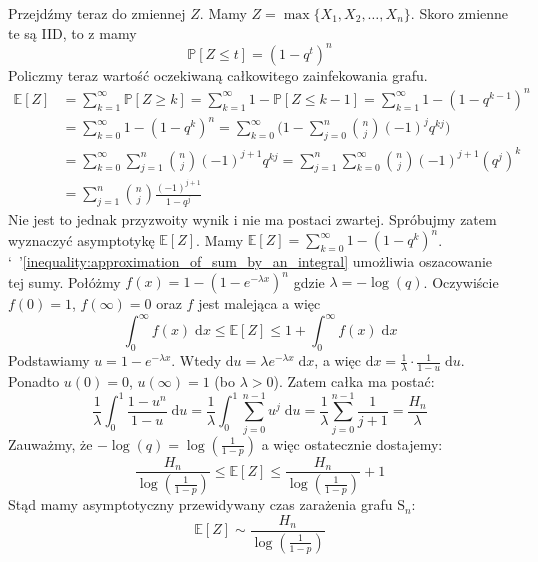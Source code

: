 Przejdźmy teraz do zmiennej $Z$. Mamy $Z=\max\{X_1,X_2,\dots,X_n\}$. Skoro zmienne te są IID, to z  mamy 
\[
    \mathbb{P}[Z\le t] = {(1-q^t)}^n
\]
Policzmy teraz wartość oczekiwaną całkowitego zainfekowania grafu. 
\begin{equation*}
\begin{aligned}
\mathbb{E}[Z] 
&= \sum_{k=1}^{\infty} \mathbb{P}[Z\ge k] 
 = \sum_{k=1}^{\infty} 1 - \mathbb{P}[Z\le k-1]
 = \sum_{k=1}^{\infty}  1 - {(1-q^{k-1})}^n  \\
&= \sum_{k=0}^{\infty}  1 - {(1-q^k)}^n 
 = \sum_{k=0}^{\infty} \Big( 1 - \sum_{j=0}^{n} \binom{n}{j} {(-1)}^j q^{kj} \Big) \\
&= \sum_{k=0}^{\infty} \sum_{j=1}^{n} \binom{n}{j} {(-1)}^{j+1} q^{kj} = \sum_{j=1}^{n} \sum_{k=0}^{\infty} \binom{n}{j} {(-1)}^{j+1} {(q^j)}^k \\
&= \sum_{j=1}^{n} \binom{n}{j} \frac{{(-1)}^{j+1}}{1-q^j}
\end{aligned}
\end{equation*}
Nie jest to jednak przyzwoity wynik i nie ma postaci zwartej. Spróbujmy zatem wyznaczyć asymptotykę $\mathbb{E}[Z]$. Mamy $\mathbb{E}[Z] = \sum_{k=0}^{\infty}  1 - {(1-q^k)}^n$. `\ '\cref{inequality:approximation_of_sum_by_an_integral} umożliwia oszacowanie tej sumy. Połóżmy $f(x) = 1 - {(1 - e^{-\lambda x})}^n$ gdzie $\lambda = -\log(q)$. Oczywiście $f(0)=1$, $f(\infty)=0$ oraz $f$ jest malejąca a więc
\[
    \int_{0}^{\infty} f(x) \; \mathrm{d}x \le \mathbb{E}[Z] \le  1 + \int_{0}^{\infty} f(x) \; \mathrm{d}x
\]
Podstawiamy $u = 1 - e^{-\lambda x}$. Wtedy $\mathrm{d}u = \lambda e^{-\lambda x} \; \mathrm{d}x$,  a więc $\mathrm{d}x = \frac{1}{\lambda}\cdot\frac{1}{1-u} \; \mathrm{d}u$. Ponadto $u(0) = 0$, $u(\infty) = 1$ (bo $\lambda > 0$). Zatem całka ma postać:
\[
 \frac{1}{\lambda} \int_{0}^{1} \frac{1 - u^n}{1 - u} \; \mathrm{d}u
= \frac{1}{\lambda} \int_{0}^{1} \sum_{j=0}^{n-1} u^j \; \mathrm{d}u
= \frac{1}{\lambda} \sum_{j=0}^{n-1} \frac{1}{j+1}
= \frac{H_n}{\lambda}
\]
Zauważmy, że $-\log(q)=\log(\frac{1}{1-p})$ a więc ostatecznie dostajemy:
\[
    \frac{H_n}{\log(\frac{1}{1-p})} \le \mathbb{E}[Z] \le \frac{H_n}{\log(\frac{1}{1-p})} + 1
\]
Stąd mamy asymptotyczny przewidywany czas zarażenia grafu $\mathrm{S}_n$:
\[
    \mathbb{E}[Z] \sim \frac{H_n}{\log(\frac{1}{1-p})}
\]

